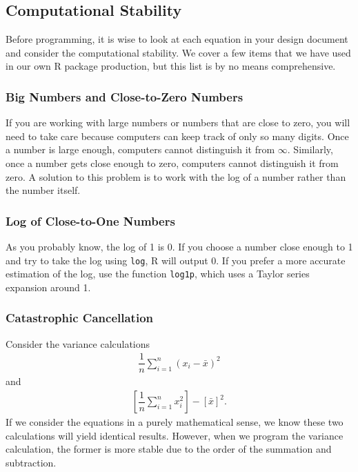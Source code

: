 \documentclass{article}
\begin{document}
\subsection{Computational Stability}
Before programming, it is wise to  look at each equation in your design document and consider the computational stability. We cover a few items that we have used in our own R package production, but this list is by no means comprehensive.

\subsubsection{Big Numbers and Close-to-Zero Numbers}
If you are working with large numbers or numbers that are close to zero, you will need to take care because computers can keep track of only so many digits. Once a number is large enough,  computers cannot distinguish it from $\infty$. Similarly, once a number gets close enough to zero, computers cannot distinguish it from zero. A solution to this problem is to work with the log of a  number rather  than the number itself. 

\subsubsection{Log of Close-to-One Numbers}
As you probably know, the log of 1 is 0. If you choose a number close enough to 1 and try to take the log   using \texttt{log}, R will output 0. If you prefer a more accurate estimation of the log, use the function \texttt{log1p}, which uses a Taylor series expansion around 1.


\subsubsection{Catastrophic Cancellation}

Consider the variance calculations
\begin{align*}
\dfrac{1}{n} \sum_{i=1}^n (x_i - \bar{x})^2 
\end{align*}
and
\begin{align*}
\left[ \dfrac{1}{n}  \sum_{i=1}^n x_i^2 \right] - \left[\bar{x} \right]^2 .
\end{align*}
If we consider the equations in a purely  mathematical sense, we know these two calculations will yield identical results. However, when we program the variance calculation, the former is more stable due to the order of the summation and subtraction.  \\
\end{document}
